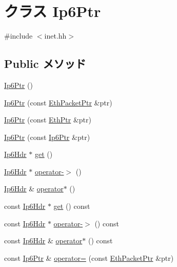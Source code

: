 \hypertarget{classNet_1_1Ip6Ptr}{
\section{クラス Ip6Ptr}
\label{classNet_1_1Ip6Ptr}
}


{\ttfamily \#include $<$inet.hh$>$}\subsection*{Public メソッド}
\begin{DoxyCompactItemize}
\item 
\hyperlink{classNet_1_1Ip6Ptr_a75d6a7523173f72c88514ee711268901}{Ip6Ptr} ()
\item 
\hyperlink{classNet_1_1Ip6Ptr_a90edf6d8ac8b0716f364984dab646a17}{Ip6Ptr} (const \hyperlink{classRefCountingPtr}{EthPacketPtr} \&ptr)
\item 
\hyperlink{classNet_1_1Ip6Ptr_a03be662680a7d23572b2adc19a93632c}{Ip6Ptr} (const \hyperlink{classNet_1_1EthPtr}{EthPtr} \&ptr)
\item 
\hyperlink{classNet_1_1Ip6Ptr_af64998b77b2440221f41c0d58a9fd829}{Ip6Ptr} (const \hyperlink{classNet_1_1Ip6Ptr}{Ip6Ptr} \&ptr)
\item 
\hyperlink{structNet_1_1Ip6Hdr}{Ip6Hdr} $\ast$ \hyperlink{classNet_1_1Ip6Ptr_af8951ecff7acf8200ba3355263f4e10c}{get} ()
\item 
\hyperlink{structNet_1_1Ip6Hdr}{Ip6Hdr} $\ast$ \hyperlink{classNet_1_1Ip6Ptr_afbc698b88972ac0ed87189431ed2405d}{operator-\/$>$} ()
\item 
\hyperlink{structNet_1_1Ip6Hdr}{Ip6Hdr} \& \hyperlink{classNet_1_1Ip6Ptr_a4d4722dfa685e1f6908c1f12384973c4}{operator$\ast$} ()
\item 
const \hyperlink{structNet_1_1Ip6Hdr}{Ip6Hdr} $\ast$ \hyperlink{classNet_1_1Ip6Ptr_a5f0ef57d1f75ef52759d4affd8772cf7}{get} () const 
\item 
const \hyperlink{structNet_1_1Ip6Hdr}{Ip6Hdr} $\ast$ \hyperlink{classNet_1_1Ip6Ptr_a04bea2f4087ca47c04affe3e878001c6}{operator-\/$>$} () const 
\item 
const \hyperlink{structNet_1_1Ip6Hdr}{Ip6Hdr} \& \hyperlink{classNet_1_1Ip6Ptr_a4dae11dfdfaedfdd731ff7caa28e2cd2}{operator$\ast$} () const 
\item 
const \hyperlink{classNet_1_1Ip6Ptr}{Ip6Ptr} \& \hyperlink{classNet_1_1Ip6Ptr_ac9f875b985f1f903a22efa555afe74e3}{operator=} (const \hyperlink{classRefCountingPtr}{EthPacketPtr} \&ptr)
\item 

\end{DoxyCompactItemize}
